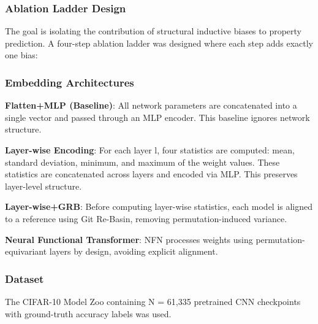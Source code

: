 
\subsubsection{Ablation Ladder Design}

The goal is isolating the contribution of structural inductive biases to property prediction. A four-step ablation ladder was designed where each step adds exactly one bias:

\begin{table}[htbp]
\centering
{}
\end{table}

\subsubsection{Embedding Architectures}

\textbf{Flatten+MLP (Baseline)}: All network parameters are concatenated into a single vector and passed through an MLP encoder. This baseline ignores network structure.

\textbf{Layer-wise Encoding}: For each layer l, four statistics are computed: mean, standard deviation, minimum, and maximum of the weight values. These statistics are concatenated across layers and encoded via MLP. This preserves layer-level structure.

\textbf{Layer-wise+GRB}: Before computing layer-wise statistics, each model is aligned to a reference using Git Re-Basin, removing permutation-induced variance.

\textbf{Neural Functional Transformer}: NFN processes weights using permutation-equivariant layers by design, avoiding explicit alignment.

\subsubsection{Dataset}

The CIFAR-10 Model Zoo containing N = 61,335 pretrained CNN checkpoints with ground-truth accuracy labels was used.

